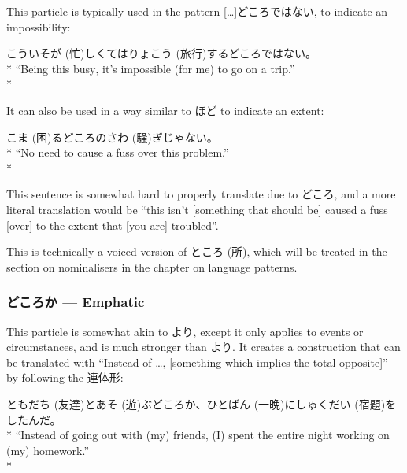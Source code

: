 \documentclass[11pt, b5paper, twoside, openright, onecolumn]{book}
\makeatletter
\newcommand*{\rubystack}[2]{{\relscale{0.5}%
  \begin{tabular}[b]{@{}c@{}}%
    {#1}\\%
   {\textscale{2}{#2}}%
  \end{tabular}}%
}
\DeclareRobustCommand*{\ruby}[2]{%
  \mbox{%
    \setlength{\parskip}{0ex}%
    \BeginAccSupp{method=pdfstringdef,ActualText={#1}}%
      \rubystack{\phantom{#2}}{#1}%
      \llap{%
        \rubystack{#2}{\phantom{#1}}%
      }%
    \EndAccSupp{}%
  }%
}
\renewcommand*{\ruby}[2]{#2 (#1)}%
\newenvironment{exampleblock}{
\setlength{\parindent}{0.6in}
\begin{minipage}[t]{\dimexpr\textwidth-\parindent}}
{\end{minipage}}
\makeatother
\begin{document}
This particle is typically used in the pattern […]どころではない‚ to indicate an impossibility:

\vspace{0.4cm}
\begin{exampleblock}
こう\ruby{忙}{いそが}しくては\ruby{旅行}{りょこう}するどころではない。 \\* 
“Being this busy‚ it’s impossible (for me) to go on a trip.” \\* 
\end{exampleblock}
\vspace{0.2cm}

It can also be used in a way similar to ほど to indicate an extent:

\vspace{0.4cm}
\begin{exampleblock}
\ruby{困}{こま}るどころの\ruby{騒}{さわ}ぎじゃない。 \\* 
“No need to cause a fuss over this problem.” \\* 
\end{exampleblock}
\vspace{0.2cm}

This sentence is somewhat hard to properly translate due to どころ‚ and a more literal translation would be “this isn’t [something that should be] caused a fuss [over] to the extent that [you are] troubled”.

This is technically a voiced version of \ruby{所}{ところ}‚ which will be treated in the section on nominalisers in the chapter on language patterns.

\subsubsection{どころか — Emphatic}

This particle is somewhat akin to より‚ except it only applies to events or circumstances‚ and is much stronger than より. It creates a construction that can be translated with “Instead of …‚ [something which implies the total opposite]” by following the 連体形:

\vspace{0.4cm}
\begin{exampleblock}
\ruby{友達}{ともだち}と\ruby{遊}{あそ}ぶどころか、\ruby{一晩}{ひとばん}に\ruby{宿題}{しゅくだい}をしたんだ。 \\* 
“Instead of going out with (my) friends‚ (I) spent the entire night working on (my) homework.” \\* 
\end{exampleblock}
\end{document}
